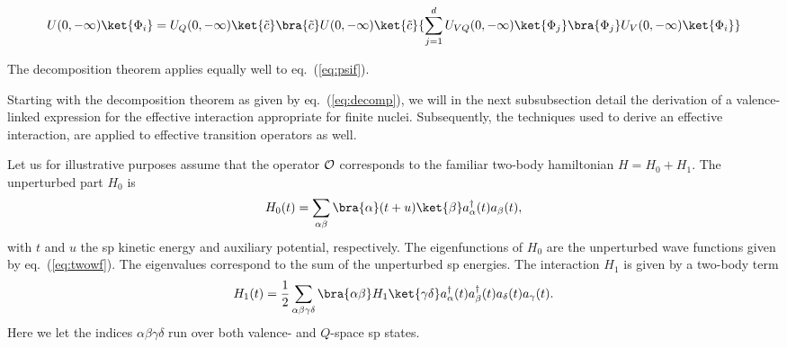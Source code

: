 \begin{equation}
	       U(0,-\infty )\ket{\Phi_i} =
	       U_Q(0,-\infty )\ket{\tilde{c}}
	       \bra{\tilde{c}}U(0,-\infty )\ket{\tilde{c}}
	       {\displaystyle \sum_{j=1}^{d}
	       U_{VQ}(0,-\infty )\ket{\Phi_j}
	       \bra{\Phi_j}U_V(0,-\infty )\ket{\Phi_i}}
	       \label{eq:decomp}
\end{equation}

The decomposition theorem applies equally well to eq.\ (\ref{eq:psif}).


Starting with the decomposition theorem as given by
eq.\ (\ref{eq:decomp}), we will in the next subsubsection
detail the derivation of a valence-linked expression
for the effective interaction appropriate for finite nuclei. Subsequently,
the techniques used to derive an effective interaction, are applied
to effective transition operators as well.


Let us for illustrative purposes
assume that the operator ${\cal O}$ corresponds to the
familiar two-body hamiltonian $H=H_0 +H_1$. The unperturbed
part $H_0$ is
\begin{equation}
H_0(t) ={\displaystyle \sum_{\alpha\beta}\bra{\alpha}(t+u)\ket{\beta}
                       a_{\alpha}^{\dagger}(t)a_{\beta}(t)},
    \label{eq:unpert}
\end{equation}
with $t$ and $u$ the sp kinetic energy and auxiliary potential, 
respectively. The eigenfunctions of $H_0$ are the unperturbed 
wave 
functions given by eq.\ (\ref{eq:twowf}).
The eigenvalues
correspond to the sum of the unperturbed sp energies. The interaction
$H_1$ is given by a two-body term
\begin{equation}
H_1(t) = {\displaystyle \frac{1}{2}
           \sum_{\alpha\beta\gamma\delta}\bra{\alpha\beta}H_1
	   \ket{\gamma\delta}a_{\alpha}^{\dagger}(t)
	   a_{\beta}^{\dagger}(t)
	   a_{\delta}(t)a_{\gamma}(t)}.
     \label{eq:inter}
\end{equation}
Here we let the indices $\alpha\beta\gamma\delta$ run over both valence-
and $Q$-space sp states. 

